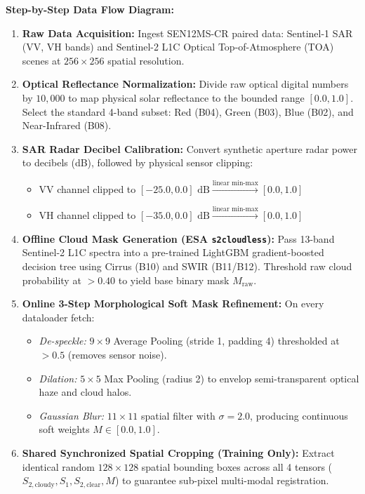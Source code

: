 \documentclass[11pt,a4paper]{article}
\begin{document}
\begin{center}
\begin{tcolorbox}[colback=boxbg,colframe=bordercolor,width=0.98\linewidth]
\textbf{\textcolor{primary}{Step-by-Step Data Flow Diagram:}}
\begin{enumerate}[leftmargin=1.5em, itemsep=0.3em]
    \item \textbf{Raw Data Acquisition:} Ingest SEN12MS-CR paired data: Sentinel-1 SAR (VV, VH bands) and Sentinel-2 L1C Optical Top-of-Atmosphere (TOA) scenes at $256 \times 256$ spatial resolution.
    \item \textbf{Optical Reflectance Normalization:} Divide raw optical digital numbers by $10{,}000$ to map physical solar reflectance to the bounded range $[0.0, 1.0]$. Select the standard 4-band subset: Red (B04), Green (B03), Blue (B02), and Near-Infrared (B08).
    \item \textbf{SAR Radar Decibel Calibration:} Convert synthetic aperture radar power to decibels (dB), followed by physical sensor clipping:
    \begin{itemize}[leftmargin=1.2em]
        \item VV channel clipped to $[-25.0, 0.0]\text{ dB} \xrightarrow{\text{linear min-max}} [0.0, 1.0]$
        \item VH channel clipped to $[-35.0, 0.0]\text{ dB} \xrightarrow{\text{linear min-max}} [0.0, 1.0]$
    \end{itemize}
    \item \textbf{Offline Cloud Mask Generation (ESA \texttt{s2cloudless}):} Pass 13-band Sentinel-2 L1C spectra into a pre-trained LightGBM gradient-boosted decision tree using Cirrus (B10) and SWIR (B11/B12). Threshold raw cloud probability at $>0.40$ to yield base binary mask $M_{\text{raw}}$.
    \item \textbf{Online 3-Step Morphological Soft Mask Refinement:} On every dataloader fetch:
    \begin{itemize}[leftmargin=1.2em]
        \item \textit{De-speckle:} $9 \times 9$ Average Pooling (stride 1, padding 4) thresholded at $>0.5$ (removes sensor noise).
        \item \textit{Dilation:} $5 \times 5$ Max Pooling (radius 2) to envelop semi-transparent optical haze and cloud halos.
        \item \textit{Gaussian Blur:} $11 \times 11$ spatial filter with $\sigma=2.0$, producing continuous soft weights $M \in [0.0, 1.0]$.
    \end{itemize}
    \item \textbf{Shared Synchronized Spatial Cropping (Training Only):} Extract identical random $128 \times 128$ spatial bounding boxes across all 4 tensors ($S_{2,\text{cloudy}}, S_1, S_{2,\text{clear}}, M$) to guarantee sub-pixel multi-modal registration.
\end{enumerate}
\end{tcolorbox}
\end{center}
\end{document}
